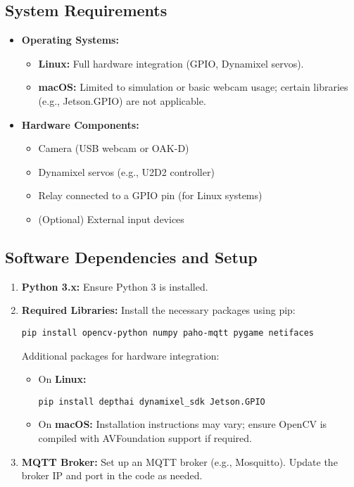 \documentclass[12pt]{article}
\begin{document}
\subsection{System Requirements}
\begin{itemize}[leftmargin=*, label={--}]
    \item \textbf{Operating Systems:}
    \begin{itemize}[leftmargin=*, label={*}]
        \item \textbf{Linux:} Full hardware integration (GPIO, Dynamixel servos).
        \item \textbf{macOS:} Limited to simulation or basic webcam usage; certain libraries (e.g., Jetson.GPIO) are not applicable.
    \end{itemize}
    \item \textbf{Hardware Components:}
    \begin{itemize}[leftmargin=*, label={*}]
        \item Camera (USB webcam or OAK-D)
        \item Dynamixel servos (e.g., U2D2 controller)
        \item Relay connected to a GPIO pin (for Linux systems)
        \item (Optional) External input devices
    \end{itemize}
\end{itemize}

\subsection{Software Dependencies and Setup}
\begin{enumerate}[leftmargin=*, label=\arabic*.]
    \item \textbf{Python 3.x:} Ensure Python 3 is installed.
    \item \textbf{Required Libraries:} Install the necessary packages using pip:
    \begin{verbatim}
pip install opencv-python numpy paho-mqtt pygame netifaces
    \end{verbatim}
    Additional packages for hardware integration:
    \begin{itemize}[leftmargin=*, label={--}]
        \item On \textbf{Linux:}
        \begin{verbatim}
pip install depthai dynamixel_sdk Jetson.GPIO
        \end{verbatim}
        \item On \textbf{macOS:} Installation instructions may vary; ensure OpenCV is compiled with AVFoundation support if required.
    \end{itemize}
    \item \textbf{MQTT Broker:} Set up an MQTT broker (e.g., Mosquitto). Update the broker IP and port in the code as needed.
\end{enumerate}
\end{document}
